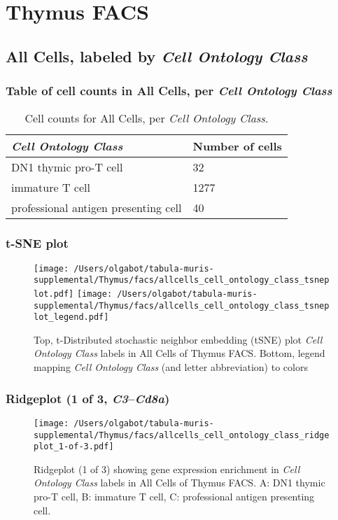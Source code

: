 \clearpage
\section{Thymus FACS}

\subsection{All Cells, labeled by \emph{Cell Ontology Class}}
\subsubsection{Table of cell counts in All Cells, per \emph{Cell Ontology Class}}\begin{table}[h]
\centering
\label{my-label}
\begin{tabular}{@{}ll@{}}
\toprule

\emph{Cell Ontology Class}& Number of cells \\ \midrule
DN1 thymic pro-T cell & 32 \\

immature T cell & 1277 \\

professional antigen presenting cell & 40 \\
\bottomrule
\end{tabular}
\caption{Cell counts for All Cells, per \emph{Cell Ontology Class}.}
\end{table}

\clearpage
\subsubsection{t-SNE plot}
\begin{figure}[h]
\centering
\texttt{[image: /Users/olgabot/tabula-muris-supplemental/Thymus/facs/allcells\_cell\_ontology\_class\_tsneplot.pdf]}
\texttt{[image: /Users/olgabot/tabula-muris-supplemental/Thymus/facs/allcells\_cell\_ontology\_class\_tsneplot\_legend.pdf]}
\caption{Top, t-Distributed stochastic neighbor embedding (tSNE) plot  \emph{Cell Ontology Class} labels in All Cells of Thymus FACS. Bottom, legend mapping \emph{Cell Ontology Class} (and letter abbreviation) to colors}
\end{figure}


\clearpage

\subsubsection{Ridgeplot (1 of 3, \emph{C3}--\emph{Cd8a})}
\begin{figure}[h]
\centering
\texttt{[image: /Users/olgabot/tabula-muris-supplemental/Thymus/facs/allcells\_cell\_ontology\_class\_ridgeplot\_1-of-3.pdf]}

\caption{ Ridgeplot (1 of 3)  showing gene expression enrichment in \emph{Cell Ontology Class} labels in All Cells of Thymus FACS. A: DN1 thymic pro-T cell, B: immature T cell, C: professional antigen presenting cell.}
\end{figure}


